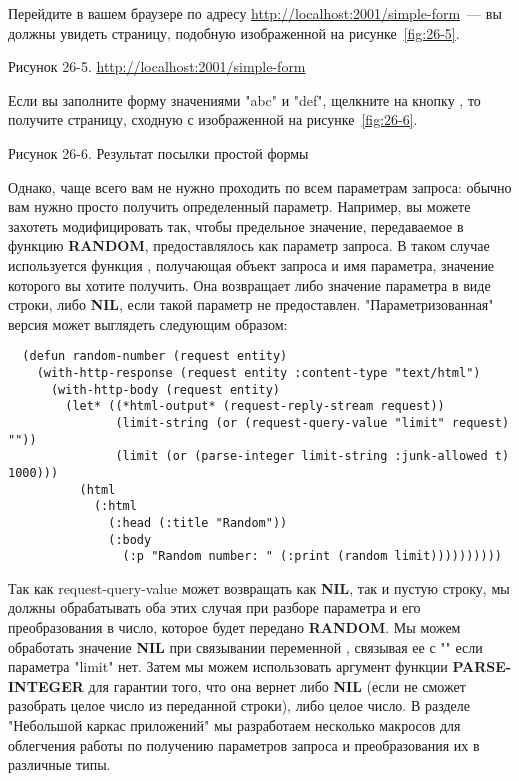 Перейдите в вашем браузере по адресу \url{http://localhost:2001/simple-form}~--- вы должны
увидеть страницу, подобную изображенной на рисунке~\ref{fig:26-5}.

Рисунок 26-5. \url{http://localhost:2001/simple-form}

Если вы заполните форму значениями "abc" и "def", щелкните на кнопку , то
получите страницу, сходную с изображенной на рисунке~\ref{fig:26-6}.

Рисунок 26-6. Результат посылки простой формы

Однако, чаще всего вам не нужно проходить по всем параметрам запроса: обычно вам нужно
просто получить определенный параметр. Например, вы можете захотеть модифицировать
 так, чтобы предельное значение, передаваемое в функцию
\textbf{RANDOM}, предоставлялось как параметр запроса. В таком случае используется функция
, получающая объект запроса и имя параметра, значение которого
вы хотите получить. Она возвращает либо значение параметра в виде строки, либо
\textbf{NIL}, если такой параметр не предоставлен. "Параметризованная" версия
 может выглядеть следующим образом:

\begin{lstlisting}
  (defun random-number (request entity)
    (with-http-response (request entity :content-type "text/html")
      (with-http-body (request entity)
        (let* ((*html-output* (request-reply-stream request))
               (limit-string (or (request-query-value "limit" request) ""))
               (limit (or (parse-integer limit-string :junk-allowed t) 1000)))
          (html
            (:html
              (:head (:title "Random"))
              (:body
                (:p "Random number: " (:print (random limit))))))))))
\end{lstlisting}

Так как request-query-value может возвращать как \textbf{NIL}, так и пустую строку, мы
должны обрабатывать оба этих случая при разборе параметра и его преобразования в число,
которое будет передано \textbf{RANDOM}. Мы можем обработать значение \textbf{NIL} при
связывании переменной , связывая ее с "" если параметра "limit"
нет. Затем мы можем использовать аргумент функции \textbf{PARSE-INTEGER}
 для гарантии того, что она вернет либо \textbf{NIL} (если не сможет
разобрать целое число из переданной строки), либо целое число. В разделе "Небольшой каркас
приложений" мы разработаем несколько макросов для облегчения работы по получению
параметров запроса и преобразования их в различные типы.

